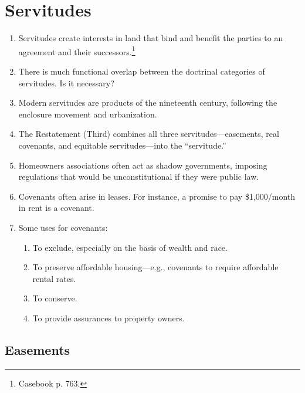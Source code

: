 \section{Servitudes}

\begin{enumerate}
    \item Servitudes create interests in land that bind and benefit the 
    parties to an agreement and their successors.\footnote{Casebook p. 763.}
    \item There is much functional overlap between the doctrinal categories of 
    servitudes. Is it necessary?
    \item Modern servitudes are products of the nineteenth century, following 
    the enclosure movement and urbanization.
    \item The Restatement (Third) combines all three servitudes---easements, 
    real covenants, and equitable servitudes---into the ``servitude.''
    \item Homeowners associations often act as shadow governments, imposing 
    regulations that would be unconstitutional if they were public law.
    \item Covenants often arise in leases.  For instance, a promise to pay 
    \$1,000/month in rent is a covenant.
    \item Some uses for covenants:
    \begin{enumerate}
        \item To exclude, especially on the basis of wealth and race.
        \item To preserve affordable housing---e.g., covenants to require 
        affordable rental rates.
        \item To conserve.
        \item To provide assurances to property owners.
    \end{enumerate}
\end{enumerate}

\subsection{Easements}

